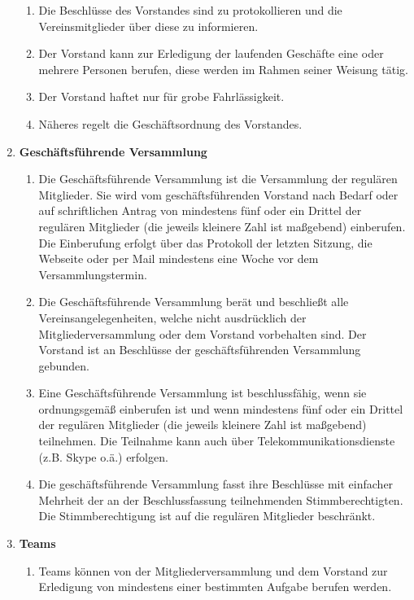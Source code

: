 \documentclass[german]{article}
\newcommand{\paragr}[1]{\item \textsf{\textbf{#1}}}
\begin{document}
\begin{enumerate}
\begin{enumerate}
			\item Die Beschlüsse des Vorstandes sind zu protokollieren und die Vereinsmitglieder über diese zu informieren.
			
			\item Der Vorstand kann zur Erledigung der laufenden Geschäfte eine oder mehrere Personen berufen, diese werden im Rahmen seiner Weisung tätig.
			
			\item Der Vorstand haftet nur für grobe Fahrlässigkeit.
			
			\item Näheres regelt die Geschäftsordnung des Vorstandes.
			
		\end{enumerate}
		
		\paragr{Geschäftsführende Versammlung}
		\begin{enumerate}
			\item Die Geschäftsführende Versammlung ist die Versammlung der regulären Mitglieder. Sie wird vom geschäftsführenden Vorstand nach Bedarf oder auf schriftlichen Antrag von mindestens fünf oder ein Drittel der regulären Mitglieder (die jeweils kleinere Zahl ist maßgebend) einberufen. Die Einberufung erfolgt über das Protokoll der letzten Sitzung, die Webseite oder per Mail mindestens eine Woche vor dem Versammlungstermin.
			\item Die Geschäftsführende Versammlung berät und beschließt alle Vereinsangelegenheiten, welche nicht ausdrücklich der Mitgliederversammlung oder dem Vorstand vorbehalten sind. Der Vorstand ist an Beschlüsse der geschäftsführenden Versammlung gebunden.
			\item Eine Geschäftsführende Versammlung ist beschlussfähig, wenn sie ordnungsgemäß einberufen ist und wenn mindestens fünf oder ein Drittel der regulären Mitglieder (die jeweils kleinere Zahl ist maßgebend) teilnehmen. Die Teilnahme kann auch über Telekommunikationsdienste (z.B. Skype o.ä.) erfolgen.
			\item Die geschäftsführende Versammlung fasst ihre Beschlüsse mit einfacher Mehrheit der an der Beschlussfassung teilnehmenden Stimmberechtigten. Die Stimmberechtigung ist auf die regulären Mitglieder beschränkt.
		\end{enumerate}
		
		
		\paragr{Teams}
		\begin{enumerate}
			
			\item Teams können von der Mitgliederversammlung und dem Vorstand zur Erledigung von mindestens einer bestimmten Aufgabe berufen werden.
			

\end{enumerate}
\end{enumerate}
\end{document}
